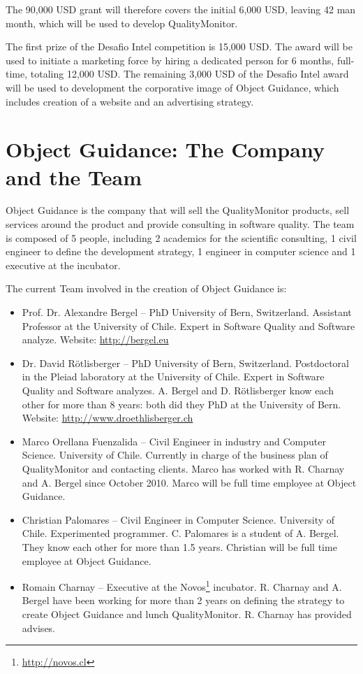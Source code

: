 \documentclass[runningheads]{llncs}
\newcommand{\seclabel}[1]{\label{sec:#1}}
\begin{document}
The 90,000 USD grant will therefore covers the initial 6,000 USD, leaving 42 man month, which will be used to develop QualityMonitor. 

The first prize of the Desafio Intel competition is 15,000 USD. The award will be used to initiate a marketing force by hiring a dedicated person for 6 months, full-time, totaling 12,000 USD. The remaining 3,000 USD of the Desafio Intel award will be used to development the corporative image of Object Guidance, which includes creation of a website and an advertising strategy.

\section{Object Guidance: The Company and the Team} \seclabel{team}

Object Guidance is the company that will sell the QualityMonitor products, sell services around the product and provide consulting in software quality. The team is composed of 5 people, including 2 academics for the scientific consulting, 1 civil engineer to define the development strategy, 1 engineer in computer science and 1 executive at the incubator.

The current Team involved in the creation of Object Guidance is:
\begin{itemize}
\item Prof. Dr. Alexandre Bergel -- PhD University of Bern, Switzerland. Assistant Professor at the University of Chile. Expert in Software Quality and Software analyze. Website: \url{http://bergel.eu}
\item Dr. David R\"otlisberger -- PhD University of Bern, Switzerland. Postdoctoral in the Pleiad laboratory at the University of Chile. Expert in Software Quality and Software analyzes. A. Bergel and D. R\"otlisberger know each other for more than 8 years: both did they PhD at the University of Bern. Website: \url{http://www.droethlisberger.ch}
\item Marco Orellana Fuenzalida -- Civil Engineer in industry and Computer Science. University of Chile. Currently in charge of the business plan of QualityMonitor and contacting clients. Marco has worked with R. Charnay and A. Bergel since October 2010. Marco will be full time employee at Object Guidance.
\item Christian Palomares -- Civil Engineer in Computer Science. University of Chile. Experimented programmer. C. Palomares is a student of A. Bergel. They know each other for more than 1.5 years. Christian will be full time employee at Object Guidance.
\item Romain Charnay -- Executive at the Novos\footnote{\url{http://novos.cl}} incubator. R. Charnay and A. Bergel have been working for more than 2 years on defining the strategy to create Object Guidance and lunch QualityMonitor. R. Charnay has provided advises.
\end{itemize}
\end{document}
